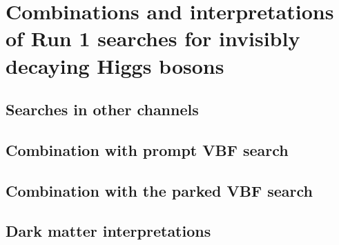 \chapter{Combinations and interpretations of Run 1 searches for invisibly decaying Higgs bosons}
\label{chap:comb}

\section{Searches in other channels}

\section{Combination with prompt VBF search}

\section{Combination with the parked VBF search}

\section{Dark matter interpretations}
